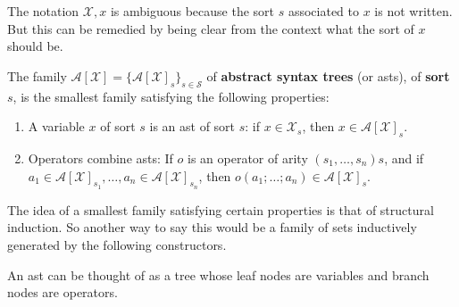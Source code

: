 \begin{remark}
    The notation $\mathcal{X},x$ is ambiguous because the sort $s$ associated to $x$ is not written. But this can be remedied by being clear from the context what the sort of $x$ should be.
\end{remark}

\begin{defin}
    The family $\mathcal{A}[\mathcal{X}]=\{ \mathcal{A}[\mathcal{X}]_s \}_{s \in \mathcal{S}}$ of \textbf{abstract syntax trees} (or asts), of \textbf{sort} $s$, is the smallest family satisfying the following properties:
    
    \begin{enumerate}
        \item A variable $x$ of sort $s$ is an ast of sort $s$: if $x \in \mathcal{X}_s$, then $x \in \mathcal{A}[\mathcal{X}]_s$.
        
        \item Operators combine asts: If $o$ is an operator of arity $(s_1, \dots, s_n)s$, and if $a_1 \in \mathcal{A}[\mathcal{X}]_{s_1}, \dots, a_n \in \mathcal{A}[\mathcal{X}]_{s_n}$, then $o(a_1;\dots; a_n) \in \mathcal{A}[\mathcal{X}]_s$.
    \end{enumerate}
\end{defin}

\begin{remark}
    The idea of a smallest family satisfying certain properties is that of structural induction. So another way to say this would be a family of sets inductively generated by the following constructors.
\end{remark}

\begin{remark}
    An ast can be thought of as a tree whose leaf nodes are variables and branch nodes are operators. 
\end{remark}

